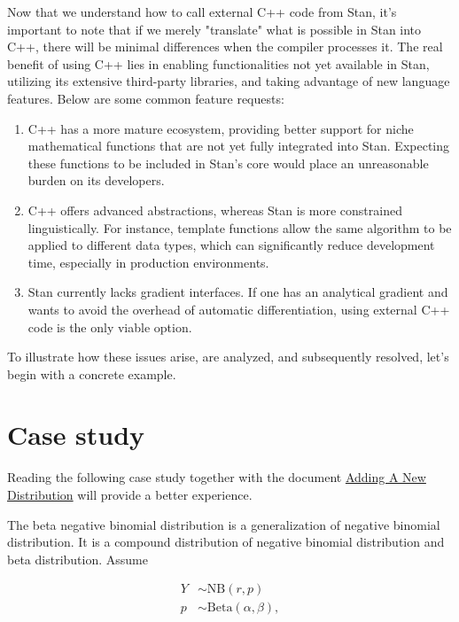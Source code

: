 \documentclass[11pt]{article}
\begin{document}
Now that we understand how to call external C++ code from Stan, it's important to note that if we merely "translate" what is possible in Stan into C++, there will be minimal differences when the compiler processes it. The real benefit of using C++ lies in enabling functionalities not yet available in Stan, utilizing its extensive third-party libraries, and taking advantage of new language features. Below are some common feature requests:

\begin{enumerate} 
\item C++ has a more mature ecosystem, providing better support for niche mathematical functions that are not yet fully integrated into Stan. Expecting these functions to be included in Stan's core would place an unreasonable burden on its developers. 
\item C++ offers advanced abstractions, whereas Stan is more constrained linguistically. For instance, template functions allow the same algorithm to be applied to different data types, which can significantly reduce development time, especially in production environments. 
\item Stan currently lacks gradient interfaces. If one has an analytical gradient and wants to avoid the overhead of automatic differentiation, using external C++ code is the only viable option. 
\end{enumerate}

To illustrate how these issues arise, are analyzed, and subsequently resolved, let's begin with a concrete example.








\section{Case study}

Reading the following case study together with the document \href{https://mc-stan.org/math/md_doxygen_2contributor__help__pages_2adding__new__distributions.html}{Adding A New Distribution} will provide a better experience.


The beta negative binomial distribution is a generalization of negative binomial distribution. It is a compound distribution of negative binomial distribution and beta distribution. Assume

\begin{equation*}
  \begin{aligned}
  Y &\sim \text{NB}(r,p) \\
  p &\sim {\textrm {Beta}}(\alpha ,\beta ),
  \end{aligned}
\end{equation*}
\end{document}
